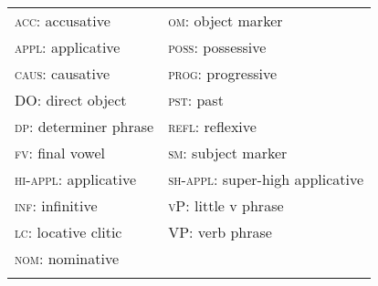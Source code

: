 \documentclass[output=paper]{langscibook}
\begin{document}
\begin{styleBody}
\end{styleBody}

\begin{tabularx}{\textwidth}{XX}
\lsptoprule
\textsc{acc:} accusative & \textsc{om:} object marker\\
\textsc{appl:} applicative & \textsc{poss:} possessive\\
\textsc{caus:} causative & \textsc{prog:} progressive\\
DO\textsc{:} direct object & \textsc{pst:} past\\
\textsc{dp:} determiner phrase & \textsc{refl:} reflexive\\
\textsc{fv:} final vowel & \textsc{sm:} subject marker\\
\textsc{hi-appl:} applicative & \textsc{sh-appl:} super-high applicative\\
\textsc{inf:} infinitive & \textsc{vP:} little v phrase\\
\textsc{lc:} locative clitic & \textsc{VP:} verb phrase\\
\textsc{nom:} nominative & \\
\lspbottomrule
\end{tabularx}
\end{document}
